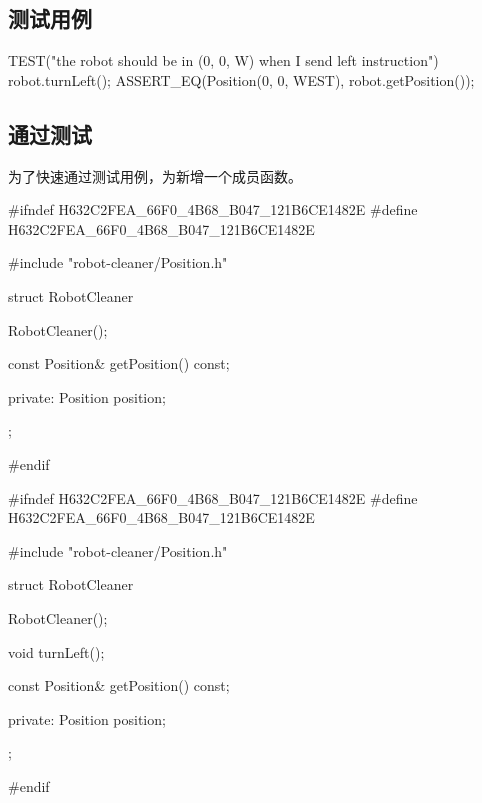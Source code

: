 \begin{content}

\subsection{测试用例}

\begin{leftbar}
\begin{c++}[caption={test/robot-cleaner/TestRobotCleaner.h}]   
TEST("the robot should be in (0, 0, W) when I send left instruction")
{
    robot.turnLeft();
    ASSERT_EQ(Position(0, 0, WEST), robot.getPosition());
}
\end{c++}
\end{leftbar}

\subsection{通过测试}

为了快速通过测试用例，为新增一个成员函数。

\begin{minipage}[t]{0.45\linewidth}
\begin{c++}[caption={include/robot-cleaner/RobotCleaner.h}]
#ifndef H632C2FEA_66F0_4B68_B047_121B6CE1482E
#define H632C2FEA_66F0_4B68_B047_121B6CE1482E

#include "robot-cleaner/Position.h"

struct RobotCleaner
{
    RobotCleaner();

    const Position& getPosition() const;
    
private:
    Position position;
};

#endif
\end{c++}
\end{minipage}%
\hfill\vrule\hfill
\begin{minipage}[t]{0.45\linewidth}
\begin{c++}[caption={include/robot-cleaner/RobotCleaner.h}]
#ifndef H632C2FEA_66F0_4B68_B047_121B6CE1482E
#define H632C2FEA_66F0_4B68_B047_121B6CE1482E

#include "robot-cleaner/Position.h"

struct RobotCleaner
{
    RobotCleaner();
    
    void turnLeft();

    const Position& getPosition() const;
    
private:
    Position position;
};

#endif
\end{c++}
\end{minipage}%


\end{content}
